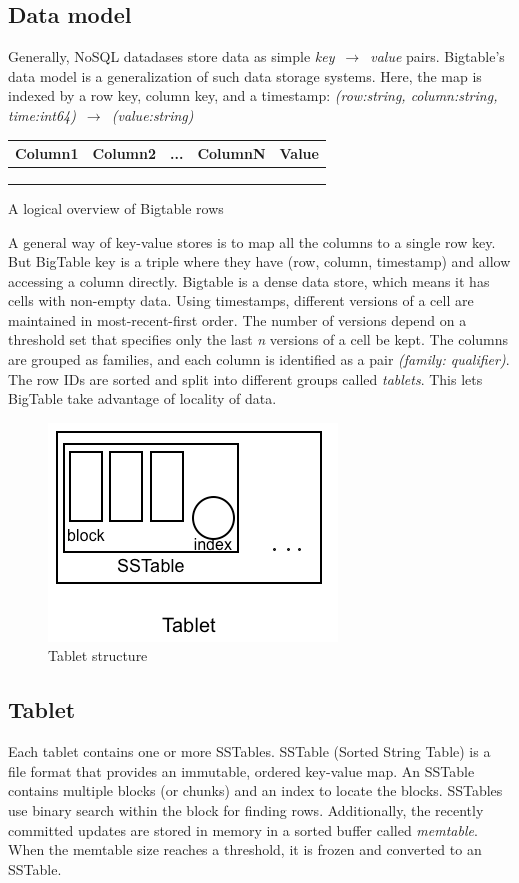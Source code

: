 \documentclass[twoside]{article}
\begin{document}
\subsection{Data model}
Generally, NoSQL datadases store data as simple \textit{key} $\,\to\,$ \textit{value} pairs. Bigtable's data model is a generalization of such data storage systems. Here, the map is indexed by a row key, column key, and a timestamp: \textit{(row:string, column:string, time:int64)} $\,\to\,$ \textit{(value:string)}\\


\begin{tabular}{|c|c|c|c||c|}
\hline
Column1 & Column2 & ... & ColumnN & Value \\
\hline
        &         &     &         &       \\
\hline
        &         &     &         &       \\
\hline
        &         &     &         &       \\
\hline
\end{tabular}
A logical overview of Bigtable rows

A general way of key-value stores is to map all the columns to a single row key. But BigTable key is a triple where they have (row, column, timestamp) and allow accessing a column directly. Bigtable is a dense data store, which means it has cells with non-empty data. Using timestamps, different versions of a cell are maintained in most-recent-first order. The number of versions depend on a threshold set that specifies only the last \textit{n} versions of a cell be kept. The columns are grouped as families, and each column is identified as a pair \textit{(family: qualifier)}. The row IDs are sorted and split into different groups called \textit{tablets}. This lets BigTable take advantage of locality of data.

\begin{figure}[h]
\centering
\includegraphics[width=0.5\linewidth]{images/tablet.png}
\caption[]{Tablet structure}
\end{figure}

\subsection{Tablet}
Each tablet contains one or more SSTables. SSTable (Sorted String Table) is a file format that provides an immutable, ordered key-value map. An SSTable contains multiple blocks (or chunks) and an index to locate the blocks. SSTables use binary search within the block for finding rows. Additionally, the recently committed updates are stored in memory in a sorted buffer called \textit{memtable}. When the memtable size reaches a threshold, it is frozen and converted to an SSTable. 
\end{document}
